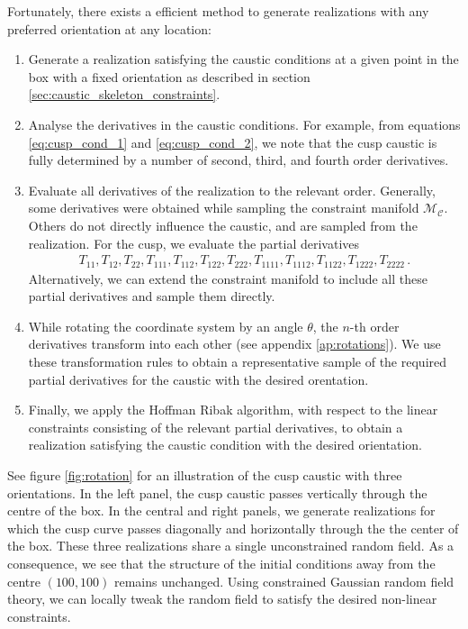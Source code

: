 \documentclass[a4paper, 11pt]{article}
\begin{document}
Fortunately, there exists a efficient method to generate realizations with any preferred orientation at any location:
\begin{enumerate}
\item 
Generate a realization satisfying the caustic conditions at a given point in the box with a fixed orientation as described in section \ref{sec:caustic_skeleton_constraints}. 
\item 
Analyse the derivatives in the caustic conditions. For example, from equations \eqref{eq:cusp_cond_1} and \eqref{eq:cusp_cond_2}, we note that the cusp caustic is fully determined by a number of second, third, and fourth order derivatives.
\item
Evaluate all derivatives of the realization to the relevant order. Generally, some derivatives were obtained while sampling the constraint manifold $\mathcal{M}_\mathcal{C}$. Others do not directly influence the caustic, and are sampled from the realization. For the cusp, we evaluate the partial derivatives 
\begin{align}
T_{11},T_{12},T_{22},T_{111},T_{112},T_{122},T_{222},T_{1111},T_{1112},T_{1122},T_{1222},T_{2222}\,.
\end{align}
Alternatively, we can extend the constraint manifold to include all these partial derivatives and sample them directly.
\item 
While rotating the coordinate system by an angle $\theta$, the $n$-th order derivatives transform into each other (see appendix \ref{ap:rotations}). We use these transformation rules to obtain a representative sample of the required partial derivatives for the caustic with the desired orentation.
\item 
Finally, we apply the Hoffman Ribak algorithm, with respect to the linear constraints consisting of the relevant partial derivatives, to obtain a realization satisfying the caustic condition with the desired orientation.
\end{enumerate}

See figure \ref{fig:rotation} for an illustration of the cusp caustic with three orientations. In the left panel, the cusp caustic passes vertically through the centre of the box. In the central and right panels, we generate realizations for which the cusp curve passes diagonally and horizontally through the the center of the box. These three realizations share a single unconstrained random field. As a consequence, we see that the structure of the initial conditions away from the centre $(100,100)$ remains unchanged. Using constrained Gaussian random field theory, we can locally tweak the random field to satisfy the desired non-linear constraints.
\end{document}
